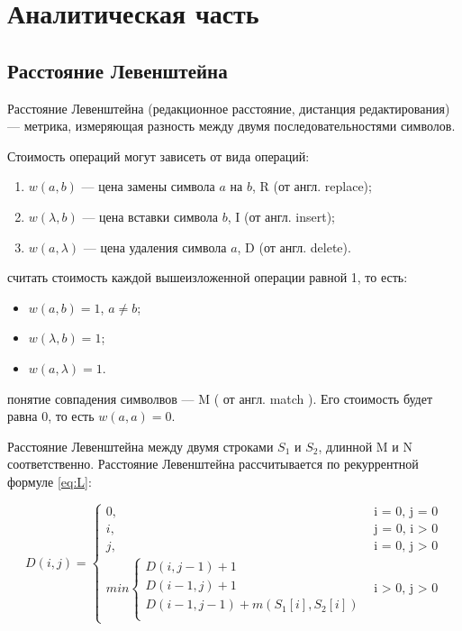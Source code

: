 \chapter{Аналитическая часть}
\section{Расстояние Левенштейна}

Расстояние Левенштейна (редакционное расстояние, дистанция редактирования) --- метрика, измеряющая разность между двумя последовательностями символов.

\noindent Стоимость операций могут зависеть от вида операций:
\begin{enumerate}
	\item $w(a, b)$ --- цена замены символа $a$ на $b$, R (от англ. replace);
	\item $w(\lambda, b)$ --- цена вставки символа $b$, I (от англ. insert);
	\item $w(a, \lambda)$ --- цена удаления символа $a$, D (от англ. delete).
\end{enumerate}

 считать стоимость каждой вышеизложенной операции равной 1, то есть:
\begin{itemize}
	\item $w(a, b) = 1$, $a \neq b$;
	\item $w(\lambda, b) = 1$;
	\item $w(a, \lambda) = 1$.
\end{itemize}

 понятие совпадения символвов --- M ( от англ. match ). Его стоимость будет равна 0, то есть $w(a, a) = 0$.

Расстояние Левенштейна между двумя строками $S_{1}$ и $S_{2}$, длинной M и N соответственно. Расстояние Левенштейна рассчитывается по рекуррентной формуле \ref{eq:L}:

\begin{equation}
	\label{eq:L}
	D(i, j) =
	\begin{cases}
		0, &\text{i = 0, j = 0}\\
		i, &\text{j = 0, i > 0}\\
		j, &\text{i = 0, j > 0}\\
		min \begin{cases}
			D(i, j - 1) + 1\\
			D(i - 1, j) + 1\\
			D(i - 1, j - 1) +  m(S_{1}[i], S_{2}[i]) \\
		\end{cases}
		&\text{i > 0, j > 0}
	\end{cases}
\end{equation}

